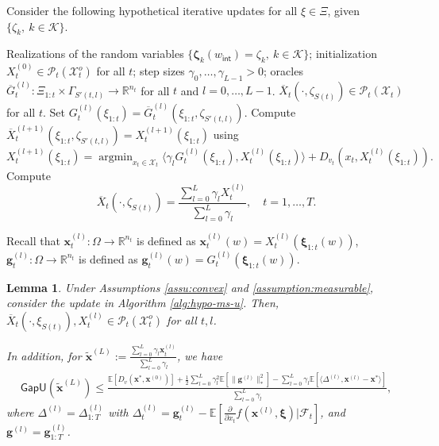 \documentclass[11pt,fullpage,letterpaper]{article}
\newcommand{\mc}{\mathcal}
\newcommand{\mb}{\mathbf}
\newcommand{\R}{\mathbb{R}}
\newcommand{\E}{\mathbb{E}}
\newcommand{\bx}{\boldsymbol{\xi}}
\newcommand{\bz}{\boldsymbol{\zeta}}
\newcommand{\internal}{\mathsf{int}}
\newcommand{\gapu}{\mathsf{GapU}}
\DeclareMathOperator*{\argmin}{argmin}
\newtheorem{lemma}{Lemma}[section]
\begin{document}
Consider the following hypothetical iterative updates for all $\xi\in \Xi$, given $\{\zeta_{k},~k\in \mc K\}$. 


\begin{algorithm}
\caption{Hypothetical mirror descent update for \eqref{eq:obj_unconstrained-online}}\label{alg:hypo-ms-u}
\begin{algorithmic}
\Require Realizations of the random variables $\{\bz_k(w_{\internal})= \zeta_k,~k\in \mc K\}$; initialization $X^{(0)}_t\in \mc P_t(\mc X^o_t)$ for all $t$; step sizes $\gamma_0,\ldots,\gamma_{L-1}>0$; oracles $\overline{G}^{(l)}_t:\Xi_{1:t}\times \Gamma_{S'(t,l)}\to \R^{n_t}$ for all $t$ and $l=0,\ldots,L-1$. 
\Ensure $\overline{X}_t(\cdot,\zeta_{S(t)})\in \mc P_t(\mc X_t)$ for all $t$.
\State Set $G_t^{(l)}(\xi_{1:t}) = \overline{G}_t^{(l)}(\xi_{1:t},\zeta_{S'(t,l)})$.
\State Compute $\overline{X}_t^{(l+1)}(\xi_{1:t},\zeta_{S'(t,l)}) = X_{t}^{(l+1)}(\xi_{1:t})$ using
\begin{equation}\label{eq:MD1}
    X_{t}^{(l+1)}(\xi_{1:t}) = \argmin_{x_t\in \mc X_t} \langle \gamma_l G^{(l)}_t(\xi_{1:t}),X^{(l)}_t(\xi_{1:t}) \rangle+ D_{v_t}(x_t, X^{(l)}_t(\xi_{1:t})).
\end{equation}
\EndFor
\EndFor
\State Compute 
\begin{equation}\label{eq:ergodic-u}
    \overline{X}_t(\cdot,\zeta_{S(t)})=\frac{\sum_{l=0}^L \gamma_lX_t^{(l)}}{\sum_{l=0}^L \gamma_l},\quad t=1,\ldots,T. 
\end{equation}
\end{algorithmic}
\end{algorithm}
Recall that $\mb x_t^{(l)}:\Omega\to \R^{n_t}$ is defined as $\mb x_t^{(l)}(w) =X_t^{(l)}(\bx_{1:t}(w))$, $\mb g_t^{(l)}:\Omega\to \R^{n_t}$ is defined as $\mb g_t^{(l)}(w) =G_t^{(l)}(\bx_{1:t}(w))$.
\begin{lemma}\label{lm:MD1}
    Under Assumptions \ref{assu:convex} and \ref{assumption:measurable}, consider the update in Algorithm \ref{alg:hypo-ms-u}. Then, $\overline{X}_t(\cdot,\xi_{S(t)}),X_t^{(l)}\in \mc P_t(\mc X_t^{o})$ for all $t,l$. 
    
    In addition, for $\widetilde{\mb x}^{(L)}:=\frac{\sum_{l=0}^L \gamma_l\mb x_t^{(l)}}{\sum_{l=0}^L \gamma_l}$, we have
   \begin{align*}
        \gapu(\widetilde{\mb x}^{(L)}) \leq \frac{\E[D_{v}(\mb x^*,\mb x^{(0)})] + \frac{1}{2}\sum_{l=0}^L \gamma_l^2  \E[\|\mb g^{(l)}\|_*^2]-\sum_{l=0}^L\gamma_l \E[\langle \Delta^{(l)},\mb x^{(l)} - \mb x^* \rangle]}{\sum_{l=0}^L \gamma_l},
   \end{align*}
    where $\Delta^{(l)} = \Delta_{1:T}^{(l)}$ with $\Delta^{(l)}_t=\mb g^{(l)}_t-\E[\frac{\partial}{\partial x_t}f(\mb x^{(l)},\bx)|\mc F_t]$, and $\mb g^{(l)} = \mb g_{1:T}^{(l)}$. 
\end{lemma}
\end{document}
